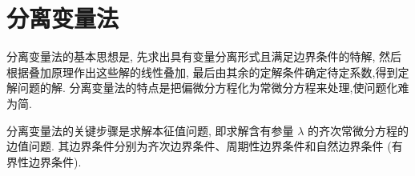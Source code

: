 \chapter{分离变量法}


分离变量法的基本思想是, 
先求出具有变量分离形式且满足边界条件的特解,
然后根据叠加原理作出这些解的线性叠加, 
最后由其余的定解条件确定待定系数,得到定解问题的解.
分离变量法的特点是把偏微分方程化为常微分方程来处理,使问题化难为简.

分离变量法的关键步骤是求解本征值问题, 
即求解含有参量 $\lambda$ 的齐次常微分方程的边值问题. 
其边界条件分别为齐次边界条件、周期性边界条件和自然边界条件
(有界性边界条件).




% 
% 
% 



